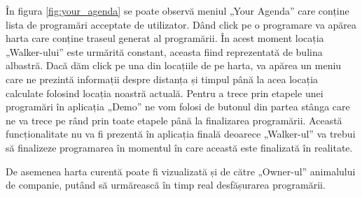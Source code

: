 În figura \ref{fig:your_agenda} se poate observă meniul „Your Agenda” care conține lista de programări acceptate de utilizator. Dând click pe o programare va apărea harta care conține traseul generat al programării. În acest moment locația „Walker-ului” este urmărită constant, aceasta fiind reprezentată de bulina albastră. Dacă dăm click pe una din locațiile de pe harta, va apărea un meniu care ne prezintă informații despre distanța și timpul până la acea locația calculate folosind locația noastră actuală. Pentru a trece prin etapele unei programări în aplicația „Demo” ne vom folosi de butonul din partea stânga care ne va trece pe rând prin toate etapele până la finalizarea programării. Această funcționalitate nu va fi prezentă în aplicația finală deoarece „Walker-ul” va trebui să finalizeze programarea în momentul în care această este finalizată în realitate. 

De asemenea harta curentă poate fi vizualizată și de către „Owner-ul” animalului de companie, putând să urmărească în timp real desfășurarea programării.

